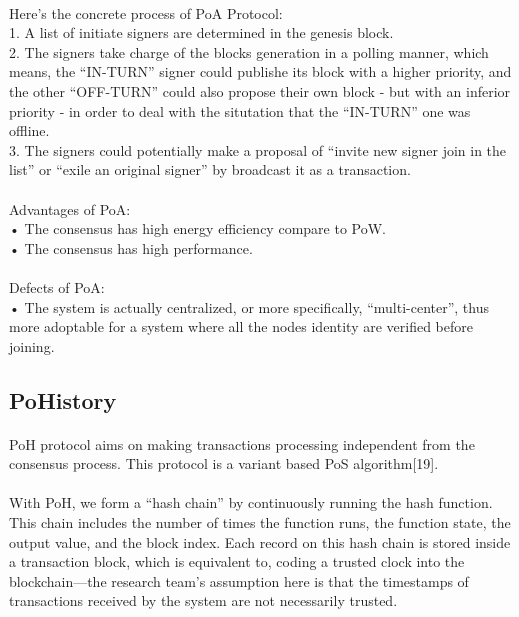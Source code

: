 \documentclass[doublespacing]{bmcart}
\begin{document}
\begin{CJK*}{UTF8}{gbsn}
	\paragraph{} 	
	Here's the concrete process of PoA Protocol: 
	\\1. A list of initiate signers are determined in the genesis block.
	\\2. The signers take charge of the blocks generation in a polling manner, which means, the ``IN-TURN'' signer could publishe its block with a higher priority, and the other ``OFF-TURN'' could also propose their own block - but with an inferior priority - in order to deal with the situtation that the ``IN-TURN'' one was offline.
	\\3. The signers could potentially make a proposal of ``invite new signer join in the list'' or ``exile an original signer'' by broadcast it as a transaction.
	\paragraph{} 
Advantages of PoA:
\\• The consensus has high energy efficiency compare to PoW.
\\• The consensus has high performance.
	\paragraph{} 
Defects of PoA:
\\• The system is actually centralized, or more specifically, ``multi-center'', thus more adoptable for a system where all the nodes identity are verified before joining.
	
	\subsection{PoHistory}
	\paragraph{} 
	PoH protocol aims on making transactions processing independent from the consensus process. This protocol is a variant based PoS algorithm[19].
	\paragraph{} 
	With PoH, we form a ``hash chain'' by continuously running the hash function. This chain includes the number of times the function runs, the function state, the output value, and the block index. Each record on this hash chain is stored inside a transaction block, which is equivalent to, coding a trusted clock into the blockchain—the research team's assumption here is that the timestamps of transactions received by the system are not necessarily trusted.

\end{CJK*}
\end{document}
